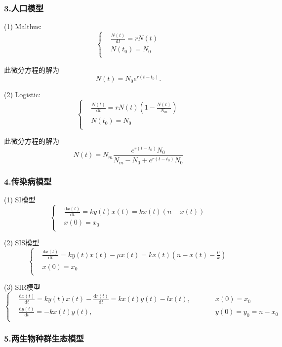 \subsubsection{3.人口模型}

(1) Malthus:
$$
\left\{ 
\begin{aligned}
{}&\frac{N(t)}{\mathrm{d}t} = rN(t)\\
{}&N(t_0) = N_0\\
\end{aligned}
\right. 
$$

此微分方程的解为
$$
N(t) = N_0e^{r(t-t_0)}. 
$$

(2) Logistic:
$$
\left\{ 
\begin{aligned}
{}&\frac{N(t)}{\mathrm{d}t} = rN(t)(1-\frac{N(t)}{N_m})\\
{}&N(t_0) = N_0\\
\end{aligned}
\right. 
$$

此微分方程的解为
$$
N(t) = N_m\frac{e^{r(t-t_0)}N_0}{N_m-N_0+e^{r(t-t_0)}N_0}
$$

\subsubsection{4.传染病模型}

(1) SI模型
$$
\left\{ 
\begin{aligned}
{}&\frac{\mathrm{d}x(t)}{\mathrm{d}t} = ky(t)x(t)=kx(t)(n-x(t))\\
{}&x(0) = x_0\\
\end{aligned}
\right. 
$$

(2) SIS模型
$$
\left\{ 
\begin{aligned}
{}&\frac{\mathrm{d}x(t)}{\mathrm{d}t} = ky(t)x(t)-\mu x(t)=kx(t)(n-x(t)-\frac{\mu}{k})\\
{}&x(0) = x_0\\
\end{aligned}
\right. 
$$

(3) SIR模型
$$
\left\{ 
\begin{aligned}
{}&\frac{\mathrm{d}x(t)}{\mathrm{d}t} = ky(t)x(t)-\frac{\mathrm{d}r(t)}{\mathrm{d}t}=kx(t)y(t)-lx(t), \qquad& {} &  x(0) = x_0   \\
{}&\frac{\mathrm{d}y(t)}{\mathrm{d}t} = -kx(t)y(t), \qquad          & {} & y(0) = y_0 = n-x_0  \\
\end{aligned}
\right. 
$$

\subsubsection{5.两生物种群生态模型}

